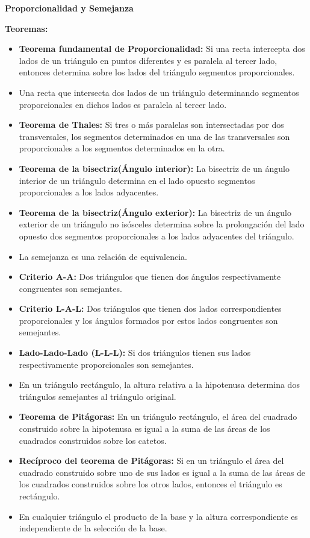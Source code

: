 \documentclass[•]{article}
\begin{document}
\begin{center}
	\begin{huge}
		\textbf{Proporcionalidad y Semejanza}
	\end{huge}
\end{center}

\begin{flushleft}
	\textbf{Teoremas:}
	\begin{itemize}
		\item \textbf{Teorema fundamental de Proporcionalidad: }Si una recta intercepta dos lados de un tri\'angulo en puntos diferentes y es paralela al tercer lado, entonces determina sobre los lados del tri\'angulo segmentos proporcionales.
		\item Una recta que intersecta dos lados de un tri\'angulo determinando segmentos proporcionales en dichos lados es paralela al tercer lado.
		\item \textbf{Teorema de Thales: }Si tres o m\'as paralelas son intersectadas por dos transversales, los segmentos determinados en una de las transversales son proporcionales a los segmentos determinados en la otra.
		\item \textbf{Teorema de la bisectriz(\'Angulo interior): }La bisectriz de un \'angulo interior de un tri\'angulo determina en el lado opuesto segmentos proporcionales a los lados adyacentes.
		\item \textbf{Teorema de la bisectriz(\'Angulo exterior): }La bisectriz de un \'angulo exterior de un tri\'angulo no is\'osceles determina sobre la prolongaci\'on del lado opuesto dos segmentos proporcionales a los lados adyacentes del tri\'angulo.
		\item La semejanza es una relaci\'on de equivalencia.
		\item \textbf{Criterio A-A: }Dos tri\'angulos que tienen dos \'angulos respectivamente congruentes son semejantes.
		\item \textbf{Criterio L-A-L: }Dos tri\'angulos que tienen dos lados correspondientes proporcionales y los \'angulos formados por estos lados congruentes son semejantes.
		\item \textbf{Lado-Lado-Lado (L-L-L): }Si dos tri\'angulos tienen sus lados respectivamente proporcionales son semejantes.
		\item En un tri\'angulo rect\'angulo, la altura relativa a la hipotenusa determina dos tri\'angulos semejantes al tri\'angulo original.
		\item \textbf{Teorema de Pit\'agoras: }En un tri\'angulo rect\'angulo, el \'area del cuadrado construido sobre la hipotenusa es igual a la suma de las \'areas de los cuadrados construidos sobre los catetos.
		\item \textbf{Rec\'iproco del teorema de Pit\'agoras: }Si en un tri\'angulo el \'area del cuadrado construido sobre uno de sus lados es igual a la suma de las \'areas de los cuadrados construidos sobre los otros lados, entonces el tri\'angulo es rect\'angulo.
		\item En cualquier tri\'angulo el producto de la base y la altura correspondiente es independiente de la selecci\'on de la base.
		

\end{itemize}
\end{flushleft}
\end{document}
